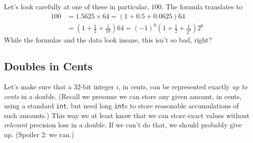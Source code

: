 \documentclass[11pt, oneside]{amsart}   	%
\begin{document}
Let's look carefully at one of these in particular, $100$. The formula translates to 
\begin{align*}
   100 &= 1.5625 \times 64
        = \left( 1 + 0.5 + 0.0625 \right) 64 \\
        &= \left( 1 + \frac{1}{2} + \frac{1}{16} \right) 64
        = (-1)^{0}\left( 1 + \frac{1}{2} + \frac{1}{2^4} \right) 2^{6}
\end{align*}
While the formulas and the data look insane, this isn't so bad, right? 

\subsection{Doubles in Cents}

Let's make sure that a 32-bit integer $i$, in cents, can be represented exactly {\em up to cents} in a double. (Recall we presume we can store any given amount, in cents, using a standard \texttt{int}, but need long \texttt{int}s to store reasonable accumulations of such amounts.) This way we at least know that we can store exact values without {\em relevant} precision loss in a double. If we can't do that, we should probably give up. (Spoiler 2: we can.)
\end{document}
